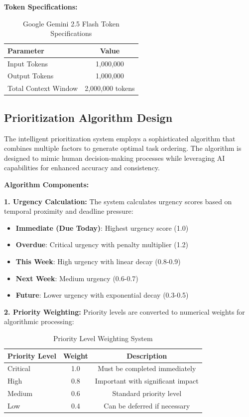 \textbf{Token Specifications:}
\begin{table}[H]
\centering
\begin{tabular}{|l|c|}
\hline
\textbf{Parameter} & \textbf{Value} \\
\hline
Input Tokens & 1,000,000 \\
\hline
Output Tokens & 1,000,000 \\
\hline
Total Context Window & 2,000,000 tokens \\
\hline
\end{tabular}
\caption{Google Gemini 2.5 Flash Token Specifications}
\end{table}

\subsection{Prioritization Algorithm Design}

The intelligent prioritization system employs a sophisticated algorithm that combines multiple factors to generate optimal task ordering. The algorithm is designed to mimic human decision-making processes while leveraging AI capabilities for enhanced accuracy and consistency.

\textbf{Algorithm Components:}

\textbf{1. Urgency Calculation:}
The system calculates urgency scores based on temporal proximity and deadline pressure:
\begin{itemize}
    \item \textbf{Immediate (Due Today)}: Highest urgency score (1.0)
    \item \textbf{Overdue}: Critical urgency with penalty multiplier (1.2)
    \item \textbf{This Week}: High urgency with linear decay (0.8-0.9)
    \item \textbf{Next Week}: Medium urgency (0.6-0.7)
    \item \textbf{Future}: Lower urgency with exponential decay (0.3-0.5)
\end{itemize}

\textbf{2. Priority Weighting:}
Priority levels are converted to numerical weights for algorithmic processing:
\begin{table}[H]
\centering
\begin{tabular}{|l|c|c|}
\hline
\textbf{Priority Level} & \textbf{Weight} & \textbf{Description} \\
\hline
Critical & 1.0 & Must be completed immediately \\
\hline
High & 0.8 & Important with significant impact \\
\hline
Medium & 0.6 & Standard priority level \\
\hline
Low & 0.4 & Can be deferred if necessary \\
\hline
\end{tabular}
\caption{Priority Level Weighting System}
\end{table}

